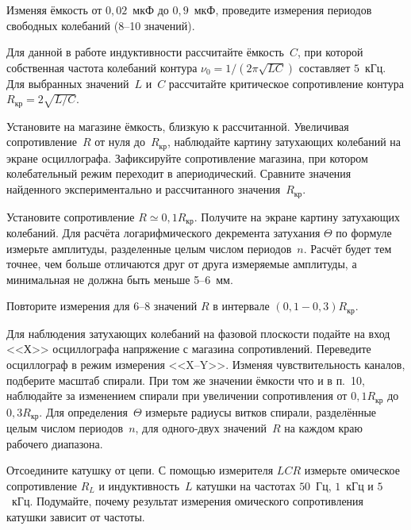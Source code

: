 \begin{lab:task}
	\item Изменяя ёмкость от $0,02$~мкФ до $0,9$~мкФ, проведите измерения
периодов свободных колебаний (8--10 значений).



	\item Для данной в работе индуктивности рассчитайте ёмкость~$C$, при которой
собственная частота колебаний контура $\nu_0 = 1/(2\pi\sqrt{LC})$ составляет
$5$~кГц. Для выбранных значений~$L$ и~$C$ рассчитайте критическое сопротивление
контура $R_\text{кр} = 2\sqrt{L/C}$.

	\item Установите на магазине ёмкость, близкую к рассчитанной. Увеличивая
сопротивление~$R$ от нуля до~$R_\text{кр}$, наблюдайте картину затухающих
колебаний на экране осциллографа. Зафиксируйте сопротивление магазина, при
котором колебательный режим переходит в апериодический. Сравните значения
найденного экспериментально и рассчитанного значения~$R_\text{кр}$.

	\item Установите сопротивление $R \simeq 0,1 R_\text{кр}$. Получите
на экране картину затухающих колебаний. Для расчёта логарифмического декремента
затухания $\Theta$ по формуле~ измерьте амплитуды,
разделенные целым числом периодов~$n$. Расчёт будет тем точнее, чем больше
отличаются друг от друга измеряемые амплитуды, а минимальная не должна быть
меньше 5--6~мм.

	\item Повторите измерения для 6--8 значений $R$ в 
    интервале $(0,1-0,3)R_\text{кр}$.


	\item Для наблюдения затухающих колебаний на фазовой плоскости подайте на
вход <<Х>> осциллографа напряжение с магазина сопротивлений. Переведите
осциллограф в режим измерения <<X--Y>>. Изменяя чувствительность каналов,
подберите масштаб спирали. При том же значении ёмкости что и в п.~10, наблюдайте
за изменением спирали при увеличении сопротивления от $0,1R_\text{кр}$  до
$0,3R_\text{кр}$. Для определения~$\Theta$ измерьте радиусы витков спирали,
разделённые целым числом периодов~$n$, для одного-двух значений~$R$ на каждом
краю рабочего диапазона.

	\item Отсоедините катушку от цепи. С помощью измерителя $LCR$ измерьте
омическое сопротивление $R_L$ и индуктивность~$L$ катушки на частотах $50$~Гц,
$1$~кГц и $5$~кГц. Подумайте, почему результат измерения омического
сопротивления катушки зависит от частоты.


\end{lab:task}
